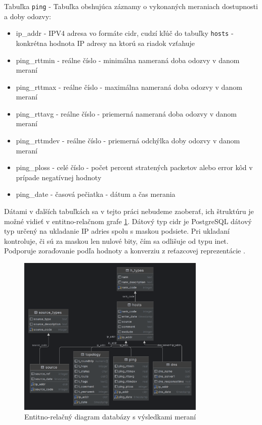Tabuľka \lstinline{ping} - Tabuľka obshujúca záznamy o vykonaných meraniach dostupnosti a doby odozvy:
\begin{itemize}
    \item ip\_addr - IPV4 adresa vo formáte cidr, cudzí kľúč do tabuľky \lstinline{hosts} - konkrétna hodnota IP adresy na ktorú sa riadok vzťahuje
    \item ping\_rttmin - reálne číslo - minimálna nameraná doba odozvy v danom meraní
    \item ping\_rttmax - reálne číslo - maximálna nameraná doba odozvy v danom meraní
    \item ping\_rttavg - reálne číslo - priemerná nameraná doba odozvy v danom meraní
    \item ping\_rttmdev - reálne číslo - priemerná odchýlka doby odozvy v danom meraní
    \item ping\_ploss - celé číslo - počet percent stratených packetov alebo error kôd v prípade negatívnej hodnoty
    \item ping\_date - časová pečiatka - dátum a čas merania
\end{itemize}

Dátami v ďalších tabuľkách sa v tejto práci nebudeme zaoberať, ich štruktúru je možné vidieť v entitno-relačnom grafe \ref{obr:ent_rel_mfile}.
Dátový typ cidr je PostgreSQL dátový typ určený na ukladanie IP adries spolu s maskou podsiete. Pri ukladaní kontroluje, či sú za maskou len nulové 
bity, čím sa odlišuje od typu inet. Podporuje zoraďovanie podľa hodnoty a konverziu z reťazcovej reprezentácie \cite{cidr}. 

\begin{figure}
    \centerline{\includegraphics[width=0.8\textwidth]{images/mfile}}
    \caption[Entitno-relačný diagram databázy s výsledkami meraní]{Entitno-relačný diagram databázy s výsledkami meraní}
    \label{obr:ent_rel_mfile}
\end{figure}

